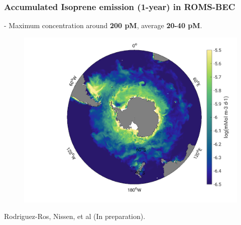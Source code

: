 \documentclass{beamer}
\begin{document}



\begin{frame}
\frametitle{Accumulated Isoprene emission (1-year) in ROMS-BEC}
- Maximum concentration around \textbf{200 pM}, average \textbf{20-40 pM}.
\begin{figure}
\includegraphics[width=0.70\linewidth]{ISO_PROD_annual_at_10m_031.png}
\end{figure}
\tiny  Rodriguez-Ros, Nissen, et al (In preparation).
\end{frame}

\end{document}
